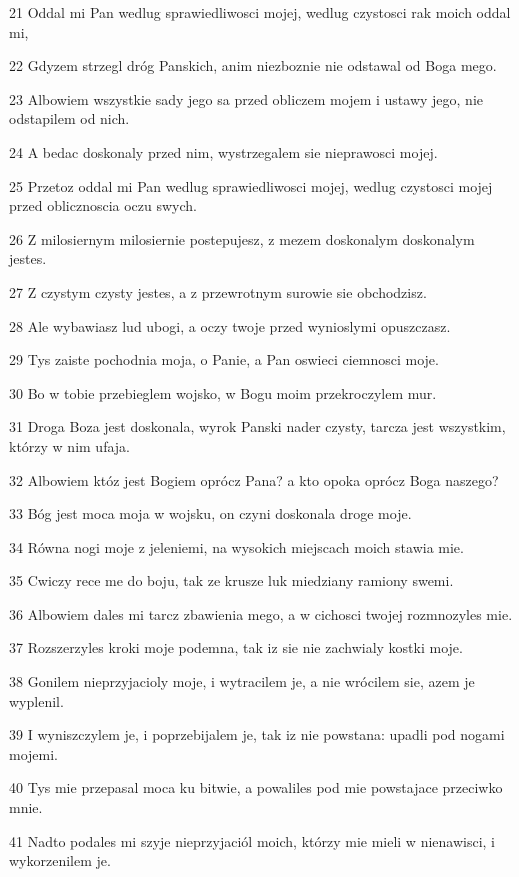 \par 21 Oddal mi Pan wedlug sprawiedliwosci mojej, wedlug czystosci rak moich oddal mi,
\par 22 Gdyzem strzegl dróg Panskich, anim niezboznie nie odstawal od Boga mego.
\par 23 Albowiem wszystkie sady jego sa przed obliczem mojem i ustawy jego, nie odstapilem od nich.
\par 24 A bedac doskonaly przed nim, wystrzegalem sie nieprawosci mojej.
\par 25 Przetoz oddal mi Pan wedlug sprawiedliwosci mojej, wedlug czystosci mojej przed oblicznoscia oczu swych.
\par 26 Z milosiernym milosiernie postepujesz, z mezem doskonalym doskonalym jestes.
\par 27 Z czystym czysty jestes, a z przewrotnym surowie sie obchodzisz.
\par 28 Ale wybawiasz lud ubogi, a oczy twoje przed wynioslymi opuszczasz.
\par 29 Tys zaiste pochodnia moja, o Panie, a Pan oswieci ciemnosci moje.
\par 30 Bo w tobie przebieglem wojsko, w Bogu moim przekroczylem mur.
\par 31 Droga Boza jest doskonala, wyrok Panski nader czysty, tarcza jest wszystkim, którzy w nim ufaja.
\par 32 Albowiem któz jest Bogiem oprócz Pana? a kto opoka oprócz Boga naszego?
\par 33 Bóg jest moca moja w wojsku, on czyni doskonala droge moje.
\par 34 Równa nogi moje z jeleniemi, na wysokich miejscach moich stawia mie.
\par 35 Cwiczy rece me do boju, tak ze krusze luk miedziany ramiony swemi.
\par 36 Albowiem dales mi tarcz zbawienia mego, a w cichosci twojej rozmnozyles mie.
\par 37 Rozszerzyles kroki moje podemna, tak iz sie nie zachwialy kostki moje.
\par 38 Gonilem nieprzyjacioly moje, i wytracilem je, a nie wrócilem sie, azem je wyplenil.
\par 39 I wyniszczylem je, i poprzebijalem je, tak iz nie powstana: upadli pod nogami mojemi.
\par 40 Tys mie przepasal moca ku bitwie, a powaliles pod mie powstajace przeciwko mnie.
\par 41 Nadto podales mi szyje nieprzyjaciól moich, którzy mie mieli w nienawisci, i wykorzenilem je.
